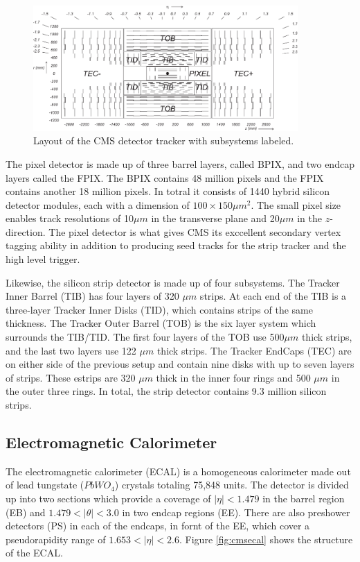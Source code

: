    \begin{figure}[H]
 	\centering
 	\includegraphics[width=0.9\textwidth]{figures/CMS_tracker.pdf}
 	\singlespace
 	\caption{Layout of the CMS detector tracker with subsystems labeled.}
 	\label{fig:cmstracker}
 \end{figure}

The pixel detector is made up of three barrel layers, called BPIX, and two endcap layers called the FPIX. The BPIX contains 48 million pixels and the FPIX contains another 18 million pixels. In totral it consists of 1440 hybrid silicon detector modules, each with a dimension of $100 \times 150 \mu m^{2}$. The small pixel size enables track resolutions of 10$\mu m$ in the transverse plane and 20$\mu m$ in the $z$-direction. The pixel detector is what gives CMS its exccellent secondary vertex tagging ability in addition to producing seed tracks for the strip tracker and the high level trigger.

Likewise, the silicon strip detector is made up of four subsystems. The Tracker Inner Barrel (TIB) has four layers of 320 $\mu m$ strips. At each end of the TIB is a three-layer Tracker Inner Disks (TID), which contains strips of the same thickness. The Tracker Outer Barrel (TOB) is the six layer system which surrounds the TIB/TID. The first four layers of the TOB use 500$\mu m$ thick strips, and the last two layers use 122 $\mu m$ thick strips. The Tracker EndCaps (TEC) are on either side of the previous setup and contain nine disks with up to seven layers of strips. These estrips are 320 $\mu m$ thick in the inner four rings and 500 $\mu m$ in the outer three rings. In total, the strip detector contains 9.3 million silicon strips.

 \subsection{Electromagnetic Calorimeter}

 The electromagnetic calorimeter (ECAL) is a homogeneous calorimeter made out of lead tungstate ($PbWO_{4}$) crystals totaling 75,848 units. The detector is divided up into two sections which provide a coverage of $|\eta| < 1.479$ in the barrel region (EB) and $1.479 < |\theta| < 3.0$ in two endcap regions (EE). There are also preshower detectors (PS) in each of the endcaps, in fornt of the EE, which cover a pseudorapidity range of $1.653 < |\eta| < 2.6$. Figure \ref{fig:cmsecal} shows the structure of the ECAL.

